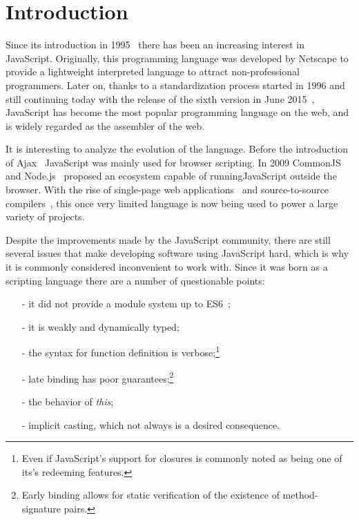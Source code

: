 \documentclass{sig-alternate}
\begin{document}



\section{Introduction}
Since its introduction in 1995~\cite{web:js} there has been an increasing interest in JavaScript. Originally, this programming language was developed by Netscape to provide a lightweight interpreted language to attract non-professional programmers. Later on, thanks to a standardization process started in 1996 and still continuing today with the release of the sixth version in June 2015~\cite{web:ecmascript6}, JavaScript has become the most popular programming language on the web, and is widely regarded as the assembler of the web.

It is interesting to analyze the evolution of the language. Before the introduction of Ajax~\cite{web:ajax} JavaScript was mainly used for browser scripting. In 2009 CommonJS~\cite{web:commonjs} and Node.js~\cite{web:nodejs} proposed an ecosystem capable of running\newline JavaScript outside the browser. With the rise of single-page web applications~\cite{web:spa} and source-to-source compilers~\cite{web:compile2js}, this once very limited language is now being used to power a large variety of projects.

Despite the improvements made by the JavaScript community, there are still several issues that make developing software using JavaScript hard, which is why it is commonly considered inconvenient to work with. Since it was born as a scripting language there are a number of questionable points:

\begin{itemize}
	\item[-] it did not provide a module system up to ES6~\cite{web:es6modules};
	\item[-] it is weakly and dynamically typed;
	\item[-] the syntax for function definition is verbose;\footnote{Even if JavaScript's support for closures is commonly noted as being one of its\rq{s} redeeming features.}
	\item[-] late binding has poor guarantees;\footnote{Early binding allows for static verification of the existence of method-signature pairs.}
	\item[-] the behavior of \emph{this};
	\item[-] implicit casting, which not always is a desired consequence.
\end{itemize}
\end{document}
